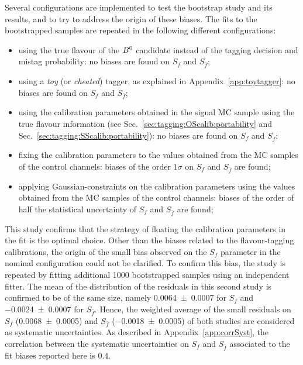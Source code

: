 Several configurations are implemented to test the bootstrap study and its results, and to try to address the origin of these
biases. The fits to the bootstrapped samples are repeated in the following different configurations:
\begin{itemize}[noitemsep,topsep=0pt]
\item  using the true flavour of the $B^0$ candidate instead of the tagging decision and mistag probability: no biases are found
on $S_{f}$ and $S_{\bar f}$;
\item using a \emph{toy} (or \emph{cheated}) tagger, as explained in Appendix~\ref{app:toytagger}: no biases are found on $S_{f}$
and $S_{\bar f}$;
\item using the calibration parameters obtained in the signal MC sample using the true flavour information (see
Sec.~\ref{sec:tagging:OScalib:portability} and Sec.~\ref{sec:tagging:SScalib:portability}): no biases are found on $S_{f}$ and
$S_{\bar f}$;
\item fixing the calibration parameters to the values obtained from the MC samples of the control channels: biases of the order $1\sigma$ on $S_{f}$ and $S_{\bar f}$ are found;
\item applying Gaussian-constraints on the calibration parameters using the values obtained from the MC samples of the control channels: biases
of the order of half the statistical uncertainty of $S_{f}$ and $S_{\bar f}$ are found;
\end{itemize}
This study confirms that the strategy of floating the calibration parameters in the fit is the optimal choice. Other than the
biases related to the flavour-tagging calibrations, the origin of the small bias observed on
the $S_{f}$ parameter in the nominal configuration could not be clarified. To confirm this bias, the study is repeated by fitting additional 1000 bootstrapped
samples using an independent fitter. The mean of the distribution of the residuals in this second study is confirmed to be of the same size,
namely \num{0.0064\pm0.0007} for $S_{f}$ and \num{-0.0024\pm0.0007} for $S_{\bar f}$. Hence, the weighted average of the small residuals
on $S_{f}$ (\num{0.0068\pm0.0005}) and $S_{\bar f}$ (\num{-0.0018\pm0.0005}) of both studies are considered as systematic uncertainties.
As described in Appendix~\ref{app:corrSyst}, the correlation between the systematic uncertainties on $S_{f}$ and $S_{\bar f}$ associated to the fit biases reported here is $0.4$.


